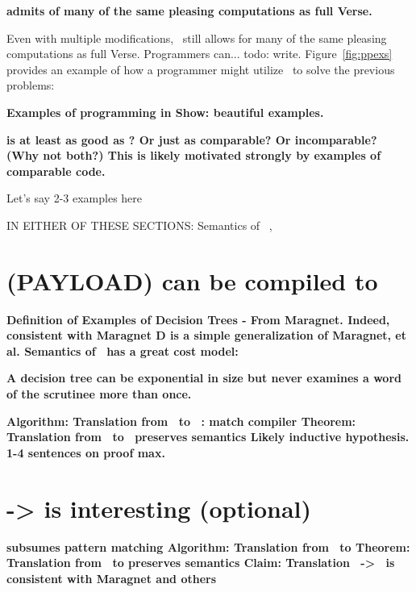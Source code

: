 \documentclass[manuscript,screen,review, 12pt]{acmart}
\begin{document}
\begin{outline}[enumerate]
    \2 \bf{{\VMinus} admits of many of the same pleasing computations as full Verse. }
    
    Even with multiple modifications, \VMinus\ still allows for many of the same
    pleasing computations as full Verse. Programmers can... todo: write.
    Figure~\ref{fig:ppexs} provides an example of how a programmer might utilize
    \VMinus\ to solve the previous problems:

    \2 \bf{Examples of programming in \VMinus }
    \3 \bf{Show: beautiful examples. }
   
   
    \2 \bf{{\VMinus} is at least as good as {\PPlus}? Or just as comparable? }
        Or incomparable? (Why not both?)
    \3 \bf{\bf{This is likely motivated strongly by examples of comparable code.}}

    \4 Let's say 2-3 examples here

    \end{outline}

IN EITHER OF THESE SECTIONS: Semantics of \PPlus\ , \VMinus

\section{(PAYLOAD) {\VMinus} can be compiled to }
\begin{outline}[enumerate]
    \1 \bf{Definition of \D }
    \1 \bf{Examples of Decision Trees - From Maragnet. }
    \2 \bf{Indeed, consistent with Maragnet }
    \1 \bf{D is a simple generalization of Maragnet, et al. }
    \1 \bf{Semantics of \D }
    \1 \bf{\D\ has a great cost model: }

    \bf{A decision tree can be exponential in size but never examines a word of
    the scrutinee more than once. }

    \1 \bf{Algorithm: Translation from \VMinus\ to \D\ : match compiler }
    \1 \bf{Theorem: Translation from \VMinus\ to \D\ preserves semantics }
    \2 \bf{Likely inductive hypothesis. 1-4 sentences on proof max. }
\end{outline}

\section{\PPlus -> \VMinus is interesting (optional)}
\begin{outline}[enumerate]
    \1 \bf{\VMinus subsumes pattern matching }
    \1 \bf{Algorithm: Translation from \PPlus\ to \VMinus}
    \1 \bf{Theorem: Translation from \PPlus\ to \VMinus preserves semantics }
    \1 \bf{Claim: Translation \PPlus\ -> \D\ is consistent with Maragnet and others}
\end{outline}
\end{document}
